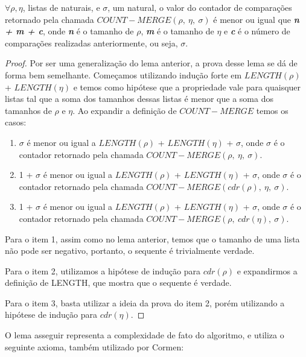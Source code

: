 \begin{lemma}
  \label{cmerge_general_case}
  $\forall \rho, \eta$, listas de naturais, e $\sigma$, um natural,
  o valor do contador de comparações retornado pela chamada 
  $COUNT-MERGE(\rho,\ \eta,\ \sigma)$ é menor ou igual que 
  \textbf{\textit{n + m + c}}, onde \textbf{\textit{n}} é o 
  tamanho de $\rho$, \textbf{\textit{m}} é o tamanho de $\eta$ e
  \textbf{\textit{c}} é o número de comparações realizadas anteriormente, 
  ou seja, $\sigma$.
\end{lemma}

\begin{proof}
  Por ser uma generalização do lema anterior, a prova desse lema se
  dá de forma bem semelhante. Começamos utilizando indução forte em 
  $LENGTH(\rho)$ + $LENGTH(\eta)$ e temos como hipótese que a propriedade
  vale para quaisquer listas tal que a soma dos tamanhos 
  dessas listas é menor que a soma dos tamanhos de $\rho$ e $\eta$.
  Ao expandir a definição de $COUNT-MERGE$ temos os casos:

  \begin{enumerate}
    \item $\sigma$ é menor ou igual a $LENGTH(\rho)$ + $LENGTH(\eta)$ 
      + $\sigma$, onde $\sigma$ é o contador retornado pela
      chamada $COUNT-MERGE(\rho,\ \eta,\ \sigma)$.
     
  \item 1 + $\sigma$ é menor ou igual a 
    $LENGTH(\rho)$ + $LENGTH(\eta)$ + $\sigma$, onde $\sigma$ é o contador
    retornado pela chamada $COUNT-MERGE(cdr(\rho),\ \eta,\ \sigma)$.

  \item 1 + $\sigma$ é menor ou igual a $LENGTH(\rho)$ + 
    $LENGTH(\eta)$ + $\sigma$, onde $\sigma$ é o contador
    retornado pela chamada $COUNT-MERGE(\rho,\ cdr(\eta),\ \sigma)$.
\end{enumerate}

Para o item 1, assim como no lema anterior, temos que o tamanho de uma
lista não pode ser negativo, portanto, o sequente é trivialmente verdade.

Para o item 2, utilizamos a hipótese de indução para $cdr(\rho)$ e 
expandirmos a definição de LENGTH, que mostra que o sequente é verdade.

Para o item 3, basta utilizar a ideia da prova do item 2, porém utilizando
a hipótese de indução para $cdr(\eta)$.
\end{proof}

O lema asseguir representa a complexidade de fato do algoritmo,
e utiliza o seguinte axioma, também utilizado por Cormen\cite{cormen2012algoritmos}:

